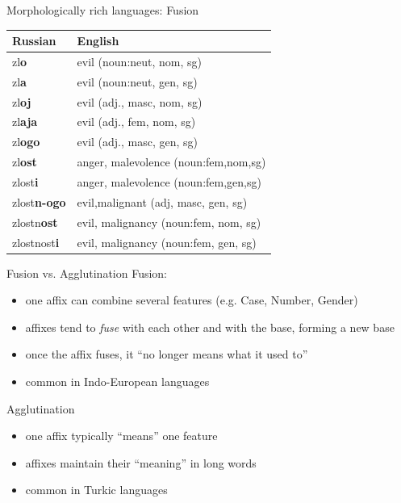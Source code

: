\documentclass{beamer}
\begin{document}
\begin{frame}{Morphologically rich languages: Fusion}
\begin{small}
\begin{tabular}{l|l}
Russian & English\\
\hline
zl{\bf o} & evil (noun:neut, nom, sg)\\
zl{\bf a} & evil (noun:neut, gen, sg)\\
zl{\bf oj} & evil (adj., masc, nom, sg)\\
zl{\bf aja} & evil (adj., fem, nom, sg) \\
zl{\bf ogo} & evil (adj., masc, gen, sg) \\
zl{\bf ost} & anger, malevolence (noun:fem,nom,sg)\\
zlost{\bf i} & anger, malevolence (noun:fem,gen,sg)\\
zlost{\bf n-ogo} & evil,malignant (adj, masc, gen, sg)\\
zlostn{\bf ost} & evil, malignancy (noun:fem, nom, sg)\\
zlostnost{\bf i} & evil, malignancy (noun:fem, gen, sg)\\
\hline
\end{tabular}
\end{small}
\end{frame}


\begin{frame}{Fusion vs. Agglutination}
  Fusion:
  \begin{itemize}
  \item one affix can combine several features (e.g. Case, Number, Gender)
  \item affixes tend to {\it fuse} with each other and with the base, forming a new base
  \item once the affix fuses, it ``no longer means what it used to''
  \item common in Indo-European languages
  \end{itemize}

  Agglutination
  \begin{itemize}
  \item one affix typically ``means'' one feature
  \item affixes maintain their ``meaning'' in long words
  \item common in Turkic languages
  \end{itemize}
\end{frame}
\end{document}
